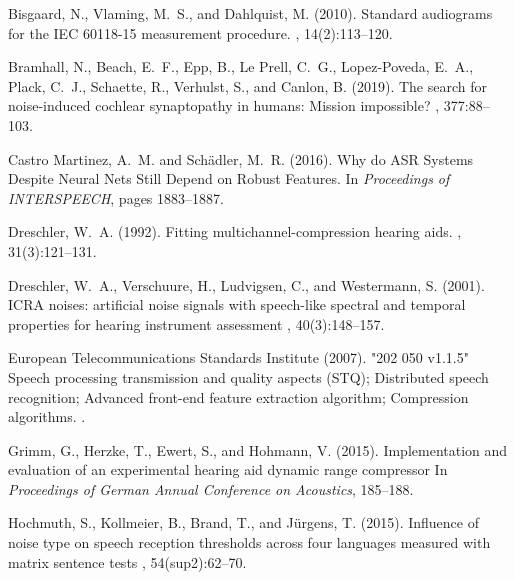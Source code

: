 \documentclass[10pt,a4paper,twocolumn]{article}
\begin{document}


\begin{thebibliography}{}
	Bisgaard, N., Vlaming, M.~S., and Dahlquist, M. (2010).
	\newblock Standard audiograms for the IEC 60118-15 measurement procedure.
	, 14(2):113--120.
	
	Bramhall, N., Beach, E.~F., Epp, B., Le Prell, C.~G., Lopez-Poveda, E.~A., Plack, C.~J., Schaette, R., Verhulst, S., and Canlon, B. (2019).
	\newblock The search for noise-induced cochlear synaptopathy in humans: Mission impossible?
	, 377:88--103.
	
	Castro Martinez, A.~M. and Schädler, M.~R. (2016).
	\newblock Why do ASR Systems Despite Neural Nets Still Depend on Robust Features.
	\newblock In {\em Proceedings of INTERSPEECH}, pages 1883--1887.
    
	Dreschler, W.~A. (1992).
	\newblock Fitting multichannel-compression hearing aids.
	, 31(3):121--131.
	
	Dreschler, W.~A., Verschuure, H., Ludvigsen, C., and Westermann, S. (2001).
	\newblock ICRA noises: artificial noise signals with speech-like spectral and temporal properties for hearing instrument assessment
	, 40(3):148--157.
	
	European Telecommunications Standards Institute (2007).
	\newblock "202 050 v1.1.5" Speech processing transmission and quality aspects (STQ); Distributed speech recognition; Advanced front-end feature extraction algorithm; Compression algorithms.
	.	
	
	Grimm, G., Herzke, T., Ewert, S., and Hohmann, V. (2015).
	\newblock Implementation and evaluation of an experimental hearing aid dynamic range compressor
	\newblock In {\em Proceedings of German Annual Conference on Acoustics}, 185--188.
	
	Hochmuth, S., Kollmeier, B., Brand, T., and Jürgens, T. (2015).
	\newblock Influence of noise type on speech reception thresholds across four languages measured with matrix sentence tests
	, 54(sup2):62--70.
	

\end{thebibliography}
\end{document}
